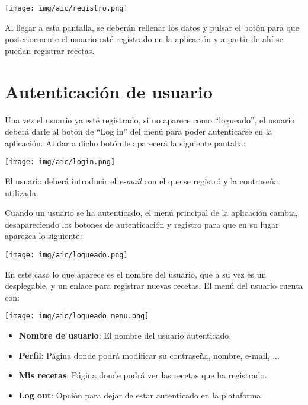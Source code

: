 \documentclass{\ClassPath/viu-tfm-template}
\begin{document}
\begin{center}
    \vspace{-10pt}
    \texttt{[image: img/aic/registro.png]}
    \vspace{-20pt}
\end{center}

Al llegar a esta pantalla, se deberán rellenar los datos y pulsar el botón para que posteriormente el usuario esté registrado en la aplicación y a partir de ahí se puedan registrar recetas.


\section{Autenticación de usuario}
Una vez el usuario ya esté registrado, si no aparece como “logueado”, el usuario deberá darle al botón de “Log in” del menú para poder autenticarse en la aplicación. Al dar a dicho botón le aparecerá la siguiente pantalla:

\begin{center}
    \vspace{-10pt}
    \texttt{[image: img/aic/login.png]}
    \vspace{-20pt}
\end{center}

El usuario deberá introducir el \textit{e-mail} con el que se registró y la contraseña utilizada.

Cuando un usuario se ha autenticado, el menú principal de la aplicación cambia, desapareciendo los botones de autenticación y registro para que en su lugar aparezca lo siguiente:


\begin{center}
    \vspace{-10pt}
    \texttt{[image: img/aic/logueado.png]}
    \vspace{-20pt}
\end{center}

En este caso lo que aparece es el nombre del usuario, que a su vez es un desplegable, y un enlace para registrar nuevas recetas. El menú del usuario cuenta con:


\begin{multicols}{2}
    \begin{center}
        \vspace{-10pt}
        \texttt{[image: img/aic/logueado\_menu.png]}
        \vspace{-20pt}
    \end{center}

   \begin{itemize}
       \item \textbf{Nombre de usuario}: El nombre del usuario autenticado.
       \item \textbf{Perfil}: Página donde podrá modificar su contraseña, nombre, e-mail, ...
       \item \textbf{Mis recetas}: Página donde podrá ver las recetas que ha registrado.
       \item \textbf{Log out}: Opción para dejar de estar autenticado en la plataforma.
   \end{itemize}
\end{multicols}
\end{document}
